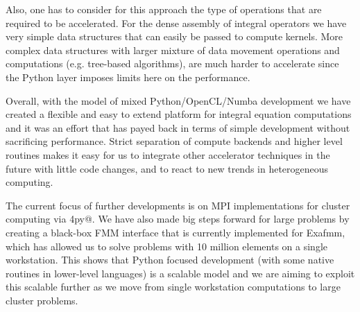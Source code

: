 Also, one has to consider for this approach the type of operations that are required to be accelerated. For the dense assembly of integral operators we have very simple data structures that can easily be passed to compute kernels. More complex data structures with larger mixture of data movement operations and computations (e.g. tree-based algorithms), are much harder to accelerate since the Python layer imposes limits here on the performance.

Overall, with the model of mixed Python/OpenCL/Numba development we have created a flexible and easy to extend platform for integral equation computations and it was an effort that has payed back in terms of simple development without sacrificing performance. Strict separation of compute backends and higher level routines makes it easy for us to integrate other accelerator techniques in the future with little code changes, and to react to new trends in heterogeneous computing.

The current focus of further developments is on MPI implementations for cluster computing via \verb@mpi4py@. We have also made big steps forward for large problems by creating a black-box FMM interface that is currently implemented for Exafmm, which has allowed us to solve problems with 10 million elements on a single workstation. This shows that Python focused development (with some native routines in lower-level languages) is a scalable model and we are aiming to exploit this scalable further as we move from single workstation computations to large cluster problems.